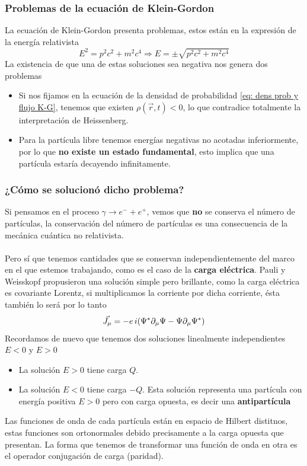 \subsubsection{Problemas de la ecuación de Klein-Gordon}
La ecuación de Klein-Gordon presenta problemas, estos están en la expresión de la energía relativista
\begin{equation}
    E^2=p^2c^2+m^2c^4 \Rightarrow E= \pm \sqrt{p^2c^2+m^2c^4}
    \label{eq: Energia relativista}
\end{equation}
La existencia de que una de estas soluciones sea negativa nos genera dos problemas
\begin{itemize}
    \item Si nos fijamos en la ecuación de la densidad de probabilidad \ref{eq: dens prob y flujo K-G}, tenemos que existen $\rho(\vec{r},t)<0$, lo que contradice totalmente la interpretación de Heissenberg.
    \item  Para la partícula libre tenemos energías negativas no acotadas inferiormente, por lo que \textbf{no existe un estado fundamental}, esto implica que una partícula estaría decayendo infinitamente.
\end{itemize}
\newpage
\subsubsection{¿Cómo se solucionó dicho problema?}
Si pensamos en el proceso $\gamma \longrightarrow e^-+e^+$, vemos que \textbf{no} se conserva el número de partículas, la conservación del número de partículas es una consecuencia de la mecánica cuántica no relativista.\\\\
Pero sí que tenemos cantidades que se conservan independientemente del marco en el que estemos trabajando, como es el caso de la \textbf{carga eléctrica}. Pauli y Weisskopf propusieron una solución simple pero brillante, como la carga eléctrica es covariante Lorentz, si multiplicamos la corriente por dicha corriente, ésta también lo será por lo tanto $$\vec{J_\mu}=-e\, i(\Psi^*\partial_\mu\Psi-\Psi\partial_\mu\Psi^*)$$
Recordamos de nuevo que tenemos dos soluciones linealmente independientes $E<0$ y $E>0$
\begin{itemize}
    \item La solución $E>0$ tiene carga $Q$.
    \item La solución $E<0$ tiene carga $-Q$. Esta solución representa una partícula con energía positiva $E>0$ pero con carga opuesta, es decir una \textbf{antipartícula}
\end{itemize}
Las funciones de onda de cada partícula están en espacio de Hilbert distitnos, estas funciones son ortonormales debido precisamente a la carga opuesta que presentan. La forma que tenemos de transformar una función de onda en otra es el operador conjugación de carga (paridad).

